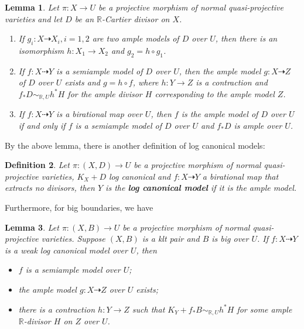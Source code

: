 \documentclass[11pt]{amsart}
\newtheorem{defn}{Definition}[section]
\newtheorem{lem}[defn]{Lemma}
\begin{document}
\begin{lem}\cite[Lemma 3.6.6]{BCHM10}
  Let $\pi:X \to U$ be a projective morphism of normal quasi-projective varieties and let $D$ be an $\mathbb{R}$-Cartier divisor on $X$.
  \begin{enumerate}
    \item If $g_{i}:X \dashrightarrow X_{i}, i=1,2$ are two ample models of $D$ over $U$, then there is an isomorphism $h:X_{1}\to X_{2}$ and $g_{2}=h \circ g_{1}$.
    \item If $f:X \dashrightarrow Y$ is a semiample model of $D$ over $U$, then the ample model $g:X \dashrightarrow  Z$ of $D$ over $U$   exists and $g=h \circ f$, where $h:Y \to Z$ is a contraction and $f_*D \sim_{\mathbb{R},U}h^*H$ for the ample divisor $H$ corresponding to the ample model $Z$.
    \item  If $f:X \dashrightarrow Y$ is a birational map over $U$, then $f$ is the ample model of $D$ over $U$ if and only if $f$ is a semiample model of $D$ over $U$ and $f_*D$ is ample over $U$.
  \end{enumerate}
\end{lem}

By the above lemma, there is another definition of log canonical models:

\begin{defn}
  Let $ \pi:(X, D)\to U $ be a projective morphism of normal quasi-projective varieties, $ K_X+D $ log canonical and $ f: X\dashrightarrow Y $  a birational map that extracts no divisors, then $ Y $ is the \textbf{log canonical model} if it is the ample model.
\end{defn}

Furthermore, for big boundaries, we have
\begin{lem}\cite[Lemma 3.9.3]{BCHM10} Let $ \pi:(X,B)\to U $ be a projective morphism of normal quasi-projective varieties. Suppose $(X, B)$ is a klt pair and  $B$ is big over $U$. If $f:X\dashrightarrow Y$ is a weak log canonical model over $U$, then
  \begin{itemize}
    \item $f$ is a semiample model over $U$;
    \item  the ample model $g:X \dashrightarrow Z$ over $U$ exists;
    \item  there is a contraction $h:Y\to Z$ such that $K_{Y}+f_*B\sim_{\mathbb{R},U} h^*H$ for some ample $\mathbb{R}$-divisor $H$ on $Z$ over $U$.
  \end{itemize}
\end{lem}
\end{document}
